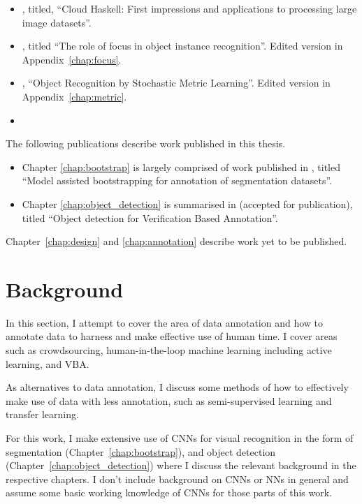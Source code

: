 \begin{itemize}
\item \cite{Batchelor2013a}, titled, ``Cloud Haskell: First impressions and applications to processing large image datasets''.
\item  \cite{Batchelor2017}, titled ``The role of focus in object instance recognition''. Edited version in Appendix~\ref{chap:focus}.
\item \cite{Batchelorc}, ``Object Recognition by Stochastic Metric Learning''. Edited version in Appendix~\ref{chap:metric}.
\item 
\end{itemize}

The following publications describe work published in this thesis. 

\begin{itemize}
\item Chapter \ref{chap:bootstrap} is largely comprised of work published in \cite{Batchelorh}, titled ``Model assisted bootstrapping for annotation of segmentation datasets''.
\item Chapter \ref{chap:object_detection} is summarised in \cite{Batchelorg} (accepted for publication), titled ``Object detection for Verification Based Annotation''.
\end{itemize}

Chapter~\ref{chap:design} and \ref{chap:annotation} describe work yet to be published.

\section {Background}

In this section, I attempt to cover the area of data annotation and how to annotate data to harness and make effective use of human time. I cover areas such as crowdsourcing, human-in-the-loop machine learning including active learning, and \gls{VBA}.

As alternatives to data annotation, I discuss some methods of how to effectively make use of data with less annotation, such as semi-supervised learning and transfer learning. 

For this work, I make extensive use of \gls{CNN}s for visual recognition in the form of segmentation (Chapter~\ref{chap:bootstrap}), and object detection (Chapter~\ref{chap:object_detection}) where I discuss the relevant background in the respective chapters. I don't include background on \gls{CNN}s or \gls{NN}s in general and assume some basic working knowledge of \gls{CNN}s for those parts of this work.


